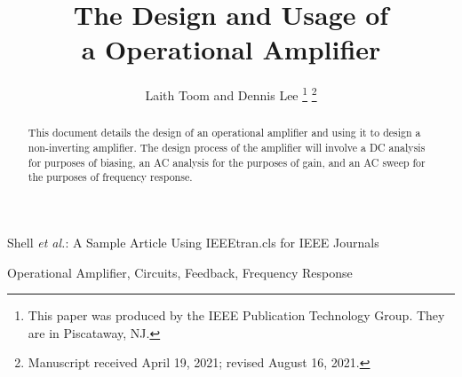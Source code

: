 \documentclass[lettersize,journal]{IEEEtran}
\begin{document}
\title{The Design and Usage of \\a Operational Amplifier}

\author{Laith Toom and Dennis Lee
\thanks{This paper was produced by the IEEE Publication Technology Group. They are in Piscataway, NJ.}%
\thanks{Manuscript received April 19, 2021; revised August 16, 2021.}}

%
{Shell \MakeLowercase{\textit{et al.}}: A Sample Article Using IEEEtran.cls for IEEE Journals}


\maketitle

\begin{abstract}
This document details the design of an operational amplifier and 
using it to design a non-inverting amplifier. The design process 
of the amplifier will involve a DC analysis for purposes of 
biasing, an AC analysis for the purposes of gain, and an 
AC sweep for the purposes of frequency response.
\end{abstract}

\begin{IEEEkeywords}
Operational Amplifier, Circuits, Feedback, Frequency Response
\end{IEEEkeywords}
\end{document}
